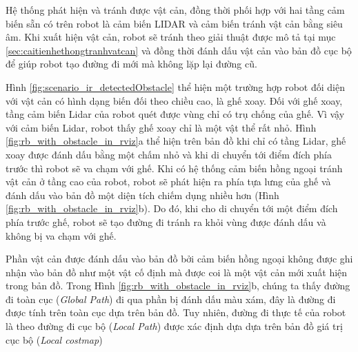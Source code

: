 Hệ thống phát hiện và tránh được vật cản, đồng thời phối hợp với hai tầng cảm biến sẵn có trên robot là cảm biến LIDAR và cảm biến tránh vật cản bằng siêu âm. Khi xuất hiện vật cản, robot sẽ tránh theo giải thuật được mô tả tại mục \ref{sec:caitienhethongtranhvatcan} và đồng thời đánh dấu vật cản vào bản đồ cục bộ để giúp robot tạo đường đi mới mà không lặp lại đường cũ.

Hình \ref{fig:scenario_ir_detectedObstacle} thể hiện một trường hợp robot đối diện với vật cản có hình dạng biến đối theo chiều cao, là ghế xoay. Đối với ghế xoay, tầng cảm biến Lidar của robot quét được vùng chỉ có trụ chống của ghế. Vì vậy với cảm biến Lidar, robot thấy ghế xoay chỉ là một vật thể rất nhỏ. Hình \ref{fig:rb_with_obstacle_in_rviz}a thể hiện trên bản đồ khi chỉ có tầng Lidar, ghế xoay được đánh dấu bằng một chấm nhỏ và khi di chuyển tới điểm đích phía trước thì robot sẽ va chạm với ghế. Khi có hệ thống cảm biến hồng ngoại tránh vật cản ở tầng cao của robot, robot sẽ phát hiện ra phía tựa lưng của ghế và đánh dấu vào bản đồ một diện tích chiếm dụng nhiều hơn (Hình \ref{fig:rb_with_obstacle_in_rviz}b). Do đó, khi cho di chuyển tới một điểm đích phía trước ghế, robot sẽ tạo đường đi tránh ra khỏi vùng được đánh dấu và không bị va chạm với ghế.

Phần vật cản được đánh dấu vào bản đồ bởi cảm biến hồng ngoại không được ghi nhận vào bản đồ như một vật cố định mà được coi là một vật cản mới xuất hiện trong bản đồ. Trong Hình \ref{fig:rb_with_obstacle_in_rviz}b, chúng ta thấy đường đi toàn cục (\textit{Global Path}) đi qua phần bị đánh dấu màu xám, đây là đường đi được tính trên toàn cục dựa trên bản đồ. Tuy nhiên, đường đi thực tế của robot là theo đường đi cục bộ (\textit{Local Path}) được xác định dựa dựa trên bản đồ giá trị cục bộ (\textit{Local costmap})

